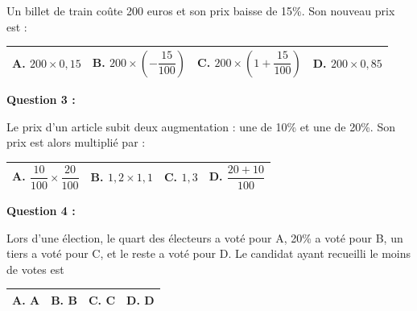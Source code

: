 \documentclass[12pt,a4paper]{exam}
\begin{document}
Un billet de train coûte 200 euros et son prix baisse de 15\%. Son nouveau prix est :

\begin{center}
    \renewcommand{\arraystretch}{3}
    \begin{tabular}{|m{3.4cm}|m{3.4cm}|m{3.9cm}|m{3.4cm}|}
    \hline
    \centering \vspace{-0.3cm} \textbf{A.} $200 \times 0,15$ & 
    \centering \vspace{-0.3cm} \textbf{B.} $200 \times \left(-\dfrac{15}{100}\right)$ & 
    \centering \vspace{-0.3cm} \textbf{C.} $200 \times \left(1+\dfrac{15}{100}\right)$ & 
    \centering \vspace{-0.3cm} \textbf{D.} $200 \times 0,85$ \tabularnewline
    \hline
    \end{tabular}
\end{center}

\vspace{10pt}

\textbf{Question 3 :}
\vspace{5pt}

Le prix d'un article subit deux augmentation : une de 10\% et une de 20\%. Son prix est alors 
multiplié par : 

\begin{center}
    \renewcommand{\arraystretch}{3}
    \begin{tabular}{|m{3.4cm}|m{3.4cm}|m{3.9cm}|m{3.4cm}|}
    \hline
    \centering \vspace{-0.3cm} \textbf{A.} $\dfrac{10}{100} \times \dfrac{20}{100}$ & 
    \centering \vspace{-0.3cm} \textbf{B.} $1,2 \times 1,1$ & 
    \centering \vspace{-0.3cm} \textbf{C.} $1,3$ & 
    \centering \vspace{-0.3cm} \textbf{D.} $\dfrac{20 + 10}{100}$ \tabularnewline
    \hline
    \end{tabular}
\end{center}

\vspace{10pt}

\textbf{Question 4 :}
\vspace{5pt}

Lors d’une élection, le quart des électeurs a voté pour A, 20\% a voté pour B, un
tiers a voté pour C, et le reste a voté pour D.
Le candidat ayant recueilli le moins de votes est

\begin{center}
    \renewcommand{\arraystretch}{3}
    \begin{tabular}{|m{3.4cm}|m{3.4cm}|m{3.9cm}|m{3.4cm}|}
    \hline
    \centering \vspace{-0.3cm} \textbf{A.} A & 
    \centering \vspace{-0.3cm} \textbf{B.} B & 
    \centering \vspace{-0.3cm} \textbf{C.} C & 
    \centering \vspace{-0.3cm} \textbf{D.} D \tabularnewline
    \hline
    \end{tabular}
\end{center}
\end{document}
